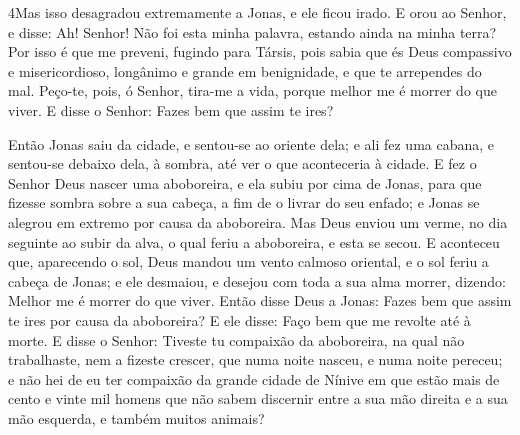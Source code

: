 \medskip

\lettrine{4} Mas isso desagradou extremamente a Jonas, e ele
ficou irado. E orou ao Senhor, e disse: Ah! Senhor! Não foi esta
minha palavra, estando ainda na minha terra? Por isso é que me
preveni, fugindo para Társis, pois sabia que és Deus compassivo e
misericordioso, longânimo e grande em benignidade, e que te
arrependes do mal. Peço-te, pois, ó Senhor, tira-me a vida,
porque melhor me é morrer do que viver. E disse o Senhor: Fazes
bem que assim te ires?

Então Jonas saiu da cidade, e sentou-se ao oriente dela; e ali fez
uma cabana, e sentou-se debaixo dela, à sombra, até ver o que
aconteceria à cidade. E fez o Senhor Deus nascer uma aboboreira,
e ela subiu por cima de Jonas, para que fizesse sombra sobre a sua
cabeça, a fim de o livrar do seu enfado; e Jonas se alegrou em
extremo por causa da aboboreira. Mas Deus enviou um verme, no
dia seguinte ao subir da alva, o qual feriu a aboboreira, e esta se
secou. E aconteceu que, aparecendo o sol, Deus mandou um vento
calmoso oriental, e o sol feriu a cabeça de Jonas; e ele desmaiou, e
desejou com toda a sua alma morrer, dizendo: Melhor me é morrer do
que viver. Então disse Deus a Jonas: Fazes bem que assim te ires
por causa da aboboreira? E ele disse: Faço bem que me revolte até à
morte. E disse o Senhor: Tiveste tu compaixão da aboboreira,
na qual não trabalhaste, nem a fizeste crescer, que numa noite
nasceu, e numa noite pereceu; e não hei de eu ter compaixão
da grande cidade de Nínive em que estão mais de cento e vinte mil
homens que não sabem discernir entre a sua mão direita e a sua mão
esquerda, e também muitos animais?

